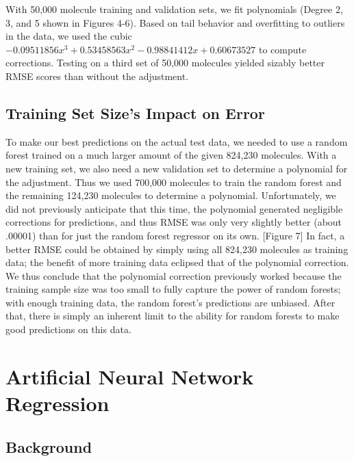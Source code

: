 \documentclass{article}
\begin{document}
With 50,000 molecule training and validation sets, we fit polynomials (Degree 2, 3, and 5 shown in Figures 4-6). Based on tail behavior and overfitting to outliers in the data, we used the cubic $-0.09511856x^3+0.53458563x^2-0.98841412x+0.60673527$ to compute corrections. Testing on a third set of 50,000 molecules yielded sizably better RMSE scores than without the adjustment.

\subsection{Training Set Size's Impact on Error}

To make our best predictions on the actual test data, we needed to use a random forest trained on a much larger amount of the given 824,230 molecules. With a new training set, we also need a new validation set to determine a polynomial for the adjustment. Thus we used 700,000 molecules to train the random forest and the remaining 124,230 molecules to determine a polynomial. Unfortunately, we did not previously anticipate that this time, the polynomial generated negligible corrections for predictions, and thus RMSE was only very slightly better (about .00001) than for just the random forest regressor on its own. [Figure 7] In fact, a better RMSE could be obtained by simply using all 824,230 molecules as training data; the benefit of more training data eclipsed that of the polynomial correction. We thus conclude that the polynomial correction previously worked because the training sample size was too small to fully capture the power of random forests; with enough training data, the random forest's predictions are unbiased. After that, there is simply an inherent limit to the ability for random forests to make good predictions on this data.



\section{Artificial Neural Network Regression}

\subsection{Background}
\end{document}
